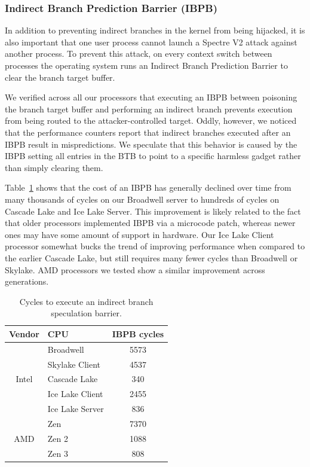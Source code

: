 \subsubsection{Indirect Branch Prediction Barrier (IBPB)}

In addition to preventing indirect branches in the kernel from being
hijacked, it is also important that one user process cannot launch a Spectre V2 attack against another process.
To prevent this attack, on every context switch between processes the operating system runs an Indirect Branch Prediction Barrier to clear the branch target buffer.

We verified across all our processors that executing an IBPB between poisoning the branch target buffer and performing an indirect branch prevents execution from being routed to the attacker-controlled target.
Oddly, however, we noticed that the performance counters report that indirect branches executed after an IBPB result in mispredictions.
We speculate that this behavior is caused by the IBPB setting all entries in the BTB to point to a specific harmless gadget rather than simply clearing them.

Table~\ref{table:ibpb} shows that the cost of an IBPB has generally
declined over time from many thousands of cycles on our Broadwell
server to hundreds of cycles on Cascade Lake and Ice Lake Server.
This improvement is likely related to the fact that older processors implemented IBPB via a microcode patch, whereas newer ones may have some amount of support in hardware.
Our Ice Lake Client processor somewhat bucks the trend of improving performance when compared to the earlier Cascade Lake, but still requires many fewer cycles than Broadwell or Skylake.
AMD processors we tested show a similar improvement across generations.

\begin{table}[h]
    \begin{center}
    \begin{tabular}{ clc }
      \textbf{Vendor} & \textbf{CPU} & \textbf{IBPB cycles} \\ \hline

      \multirow{5}{*}{Intel} & Broadwell         & 5573 \\
                             & Skylake Client    & 4537 \\
                             & Cascade Lake      & 340 \\
                             & Ice Lake Client   & 2455 \\
                             & Ice Lake Server   & 836 \\ \hline
      \multirow{3}{*}{AMD}   & Zen               & 7370 \\
                             & Zen 2             & 1088 \\
                             & Zen 3             & 808 \\ \hline
    \end{tabular}
    \end{center}
    \caption{Cycles to execute an indirect branch speculation barrier. }
    \label{table:ibpb}
\end{table}

